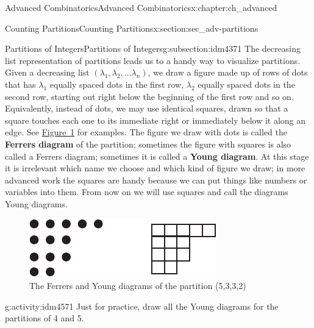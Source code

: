 \documentclass[oneside,10pt,]{book}
\newcommand{\terminology}[1]{\textbf{#1}}
\numberwithin{equation}{chapter}
\begin{document}
\begin{chapterptx}{Advanced Combinatorics}{}{Advanced Combinatorics}{}{}{x:chapter:ch_advanced}
\begin{sectionptx}{Counting Partitions}{}{Counting Partitions}{}{}{x:section:sec_adv-partitions}
\begin{subsectionptx}{Partitions of Integers}{}{Partitions of Integers}{}{}{g:subsection:idm4371}
The decreasing list representation of partitions leads us to a handy way to visualize partitions. Given a decreasing list \((\lambda_1,\lambda_2,\ldots \lambda_n)\), we draw a figure made up of rows of dots that has \(\lambda_1\) equally spaced dots in the first row, \(\lambda_2\) equally spaced dots in the second row, starting out right below the beginning of the first row and so on. Equivalently, instead of dots, we may use identical squares, drawn so that a square touches each one to its immediate right or immediately below it along an edge. See \hyperref[x:figure:FerrersYoung]{Figure~\ref{x:figure:FerrersYoung}} for examples. The figure we draw with dots is called the \terminology{Ferrers diagram} of the partition; sometimes the figure with squares is also called a Ferrers diagram; sometimes it is called a \terminology{Young diagram}. At this stage it is irrelevant which name we choose and which kind of figure we draw; in more advanced work the squares are handy because we can put things like numbers or variables into them.  From now on we will use squares and call the diagrams Young diagrams.%
\begin{figure}
\centering
\includegraphics[width=0.45\linewidth]{images/FerrersYoung}
\caption{The Ferrers and Young diagrams of the partition (5,3,3,2)\label{x:figure:FerrersYoung}}
\end{figure}
\begin{activity}{}{g:activity:idm4571}%
Just for practice, draw all the Young diagrams for the partitions of 4 and 5.%
\end{activity}

\end{subsectionptx}
\end{sectionptx}
\end{chapterptx}
\end{document}
